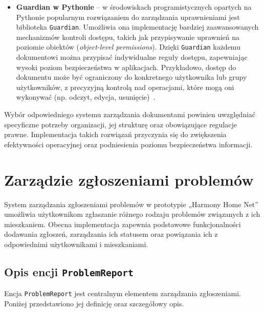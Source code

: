 \begin{itemize}
	\item \textbf{Guardian w Pythonie} -- w środowiskach programistycznych opartych na Pythonie popularnym rozwiązaniem do zarządzania uprawnieniami jest biblioteka \texttt{Guardian}. Umożliwia ona implementację bardziej zaawansowanych mechanizmów kontroli dostępu, takich jak przypisywanie uprawnień na poziomie obiektów (\emph{object-level permissions}). Dzięki \texttt{Guardian} każdemu dokumentowi można przypisać indywidualne reguły dostępu, zapewniając wysoki poziom bezpieczeństwa w aplikacjach. Przykładowo, dostęp do dokumentu może być ograniczony do konkretnego użytkownika lub grupy użytkowników, z precyzyjną kontrolą nad operacjami, które mogą oni wykonywać (np. odczyt, edycja, usunięcie)~\cite{django_guardian}.  
	
\end{itemize}

Wybór odpowiedniego systemu zarządzania dokumentami powinien uwzględniać specyficzne potrzeby organizacji, jej strukturę oraz obowiązujące regulacje prawne. Implementacja takich rozwiązań przyczynia się do zwiększenia efektywności operacyjnej oraz podniesienia poziomu bezpieczeństwa informacji.

\section{Zarządzie zgłoszeniami problemów}

System zarządzania zgłoszeniami problemów w prototypie „Harmony Home Net” umożliwia użytkownikom zgłaszanie różnego rodzaju problemów związanych z ich mieszkaniem. Obecna implementacja zapewnia podstawowe funkcjonalności dodawania zgłoszeń, zarządzania ich statusem oraz powiązania ich z odpowiednimi użytkownikami i mieszkaniami.

\subsection{Opis encji \texttt{ProblemReport}}

Encja \texttt{ProblemReport} jest centralnym elementem zarządzania zgłoszeniami. Poniżej przedstawiono jej definicję oraz szczegółowy opis.

